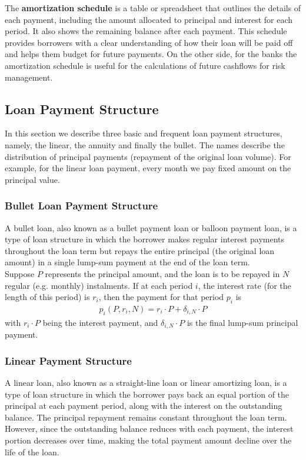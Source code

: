 \documentclass[11pt]{article}
\begin{document}
The \textbf{amortization schedule} is a table or spreadsheet that outlines the details of each payment, including the amount allocated to principal and interest for each period. It also shows the remaining balance after each payment. This schedule provides borrowers with a clear understanding of how their loan will be paid off and helps them budget for future payments. On the other side, for the banks the amortization schedule is useful for the calculations of future cashflows for risk management.

\subsection{Loan Payment Structure}

In this section we describe three basic and frequent loan payment structures, namely, the linear, the annuity and finally the bullet. The names describe the distribution of principal payments (repayment of the original loan volume). For example, for the linear loan payment, every month we pay fixed amount on the principal value. 


\subsubsection{Bullet Loan Payment Structure}

A bullet loan, also known as a bullet payment loan or balloon payment loan, is a type of loan structure in which the borrower makes regular interest payments throughout the loan term but repays the entire principal (the original loan amount) in a single lump-sum payment at the end of the loan term.\\

Suppose $P$ represents the principal amount, and the loan is to be repayed in $N$ regular (e.g. monthly) instalments. If at each period $i$, the interest rate (for the length of this period) is $r_i$, then the payment for that period $p_i$ is 
\begin{align}
	p_i(P,r_i,N) =r_i\cdot P+\delta_{i,N}\cdot P
\end{align}
with $r_i\cdot P$ being the interest payment, and $\delta_{i,N}\cdot P$ is the final lump-sum principal payment.

\subsubsection{Linear Payment Structure}

A linear loan, also known as a straight-line loan or linear amortizing loan, is a type of loan structure in which the borrower pays back an equal portion of the principal at each payment period, along with the interest on the outstanding balance. The principal repayment remains constant throughout the loan term. However, since the outstanding balance reduces with each payment, the interest portion decreases over time, making the total payment amount decline over the life of the loan.\\
\end{document}
